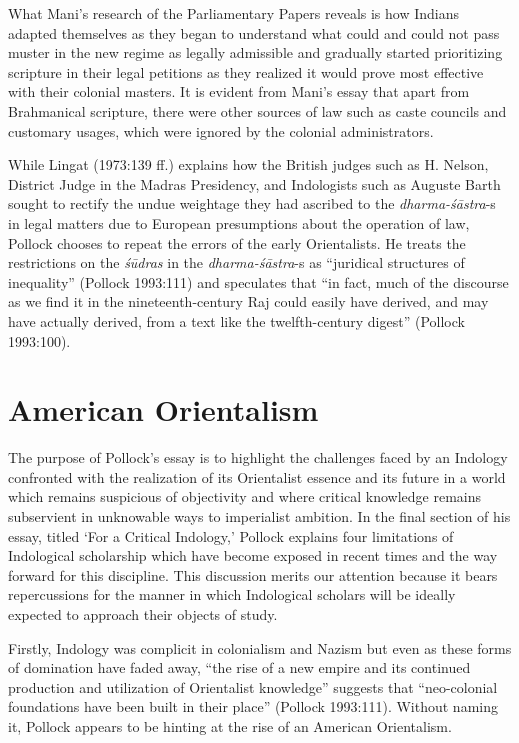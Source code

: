What Mani’s research of the Parliamentary Papers reveals is how Indians adapted themselves as they began to understand what could and could not pass muster in the new regime as legally admissible and gradually started prioritizing scripture in their legal petitions as they realized it would prove most effective with their colonial masters. It is evident from Mani’s essay that apart from Brahmanical scripture, there were other sources of law such as caste councils and customary usages, which were ignored by the colonial administrators.
\newpage

While Lingat (1973:139 ff.) explains how the British judges such as H. Nelson, District Judge in the Madras Presidency, and Indologists such as Auguste Barth sought to rectify the undue weightage they had ascribed to the {\sl dharma-śāstra}-s in legal matters due to European presumptions about the operation of law, Pollock chooses to repeat the errors of the early Orientalists. He treats the restrictions on the {\sl śūdras} in the {\sl dharma-śāstra}-s as “juridical structures of inequality” (Pollock 1993:111) and speculates that “in fact, much of the discourse as we find it in the nineteenth-century Raj could easily have derived, and may have actually derived, from a text like the twelfth-century digest” (Pollock 1993:100).
\medskip

\section*{American Orientalism}

The purpose of Pollock’s essay is to highlight the challenges faced by an Indology confronted with the realization of its Orientalist essence and its future in a world which remains suspicious of objectivity and where critical knowledge remains subservient in unknowable ways to imperialist ambition. In the final section of his essay, titled ‘For a Critical Indology,’ Pollock explains four limitations of Indological scholarship which have become exposed in recent times and the way forward for this discipline. This discussion merits our attention because it bears repercussions for the manner in which Indological scholars will be ideally expected to approach their objects of study.
\vskip 2pt


Firstly, Indology was complicit in colonialism and Nazism but even as these forms of domination have faded away, “the rise of a new empire and its continued production and utilization of Orientalist knowledge” suggests that “neo-colonial foundations have been built in their place” (Pollock 1993:111). Without naming it, Pollock appears to be hinting at the rise of an American Orientalism. 
\vskip 2pt

